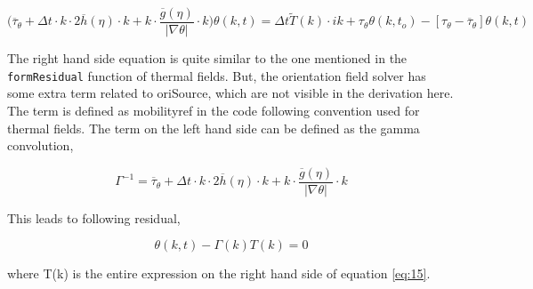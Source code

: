 \documentclass[a4paper,11pt,dvipsnames]{article}
\begin{document}
\begin{equation}
\biggl ( \overline{\tau}_\theta + \Delta t \cdot k \cdot 2 \overline{h} (\eta) \cdot k 
+ k \cdot \frac{\overline{g}(\eta)}{\left | \nabla \theta \right |} \cdot k \biggr ) \theta (k,t) = 
\Delta t \tilde{T}(k) \cdot ik + \tau_\theta \theta (k,t_o) - 
\left [ \tau_\theta - \overline{\tau}_\theta \right ] \theta (k,t) \label{eq:18}
\end{equation}

The right hand side equation is quite similar to the one mentioned in the \verb|formResidual| function of thermal fields. 
But, the orientation field solver has some extra term related to oriSource, which are not visible in the derivation here. 
The term  is defined as mobility\textunderscore ref in the code following convention used 
for thermal fields. 
The term on the left hand side can be defined as the gamma convolution, 

\begin{equation}
    \Gamma^{-1} = \overline{\tau}_\theta + \Delta t \cdot k \cdot 2 \overline{h} (\eta) \cdot k 
    + k \cdot \frac{\overline{g}(\eta)}{\left | \nabla \theta \right |} \cdot k \label{eq:19}
\end{equation}

This leads to following residual, 

\begin{equation}
    \theta (k,t) - \Gamma (k) T(k) = 0 \label{eq:20}
\end{equation}

where T(k) is the entire expression on the right hand side of equation \ref{eq:15}. 




\end{document}
